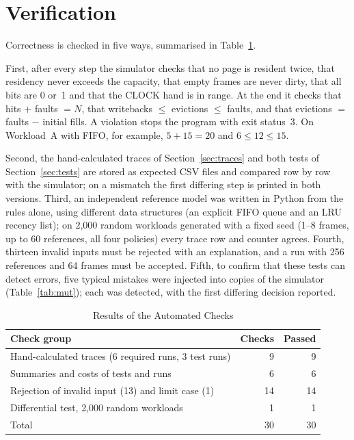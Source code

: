 \documentclass[conference,a4paper]{IEEEtran}
\begin{document}
\section{Verification}\label{sec:verif}
Correctness is checked in five ways, summarised in Table~\ref{tab:verif}.

First, after every step the simulator checks that no page is resident twice, that residency never exceeds the capacity, that empty frames are never dirty, that all bits are 0 or~1 and that the CLOCK hand is in range. At the end it checks that hits $+$ faults $= N$, that writebacks $\le$ evictions $\le$ faults, and that evictions $=$ faults $-$ initial fills. A violation stops the program with exit status~3. On Workload~A with FIFO, for example, $5 + 15 = 20$ and $6 \le 12 \le 15$.

Second, the hand-calculated traces of Section~\ref{sec:traces} and both tests of Section~\ref{sec:tests} are stored as expected CSV files and compared row by row with the simulator; on a mismatch the first differing step is printed in both versions. Third, an independent reference model was written in Python from the rules alone, using different data structures (an explicit FIFO queue and an LRU recency list); on 2{,}000 random workloads generated with a fixed seed (1--8 frames, up to 60 references, all four policies) every trace row and counter agrees. Fourth, thirteen invalid inputs must be rejected with an explanation, and a run with 256 references and 64 frames must be accepted. Fifth, to confirm that these tests can detect errors, five typical mistakes were injected into copies of the simulator (Table~\ref{tab:mut}); each was detected, with the first differing decision reported.

\begin{table}[!tb]
\renewcommand{\arraystretch}{1.1}
\caption{Results of the Automated Checks}
\label{tab:verif}
\centering\footnotesize
\begin{tabular}{l r r}
\toprule
Check group & Checks & Passed \\
\midrule
Hand-calculated traces (6 required runs, 3 test runs) & 9 & 9 \\
Summaries and costs of tests and runs & 6 & 6 \\
Rejection of invalid input (13) and limit case (1) & 14 & 14 \\
Differential test, 2{,}000 random workloads & 1 & 1 \\
\midrule
Total & 30 & 30 \\
\bottomrule
\end{tabular}
\end{table}
\end{document}
